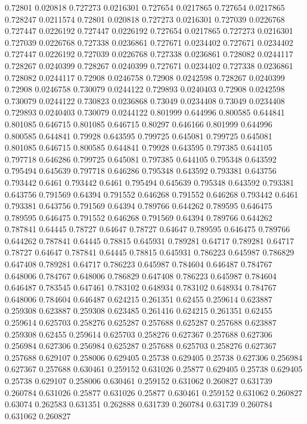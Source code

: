0.72801 0.020818
0.727273 0.0216301
0.727654 0.0217865
0.727654 0.0217865
0.728247 0.0211574
0.72801 0.020818
0.727273 0.0216301
0.727039 0.0226768
0.727447 0.0226192
0.727447 0.0226192
0.727654 0.0217865
0.727273 0.0216301
0.727039 0.0226768
0.727338 0.0236861
0.727671 0.0234402
0.727671 0.0234402
0.727447 0.0226192
0.727039 0.0226768
0.727338 0.0236861
0.728082 0.0244117
0.728267 0.0240399
0.728267 0.0240399
0.727671 0.0234402
0.727338 0.0236861
0.728082 0.0244117
0.72908 0.0246758
0.72908 0.0242598
0.728267 0.0240399
0.72908 0.0246758
0.730079 0.0244122
0.729893 0.0240403
0.72908 0.0242598
0.730079 0.0244122
0.730823 0.0236868
0.73049 0.0234408
0.73049 0.0234408
0.729893 0.0240403
0.730079 0.0244122
0.801999 0.644996
0.800585 0.644841
0.801085 0.646715
0.801085 0.646715
0.80297 0.646166
0.801999 0.644996
0.800585 0.644841
0.79928 0.643595
0.799725 0.645081
0.799725 0.645081
0.801085 0.646715
0.800585 0.644841
0.79928 0.643595
0.797385 0.644105
0.797718 0.646286
0.799725 0.645081
0.797385 0.644105
0.795348 0.643592
0.795494 0.645639
0.797718 0.646286
0.795348 0.643592
0.793381 0.643756
0.793442 0.6461
0.793442 0.6461
0.795494 0.645639
0.795348 0.643592
0.793381 0.643756
0.791569 0.64394
0.791552 0.646268
0.791552 0.646268
0.793442 0.6461
0.793381 0.643756
0.791569 0.64394
0.789766 0.644262
0.789595 0.646475
0.789595 0.646475
0.791552 0.646268
0.791569 0.64394
0.789766 0.644262
0.787841 0.64445
0.78727 0.64647
0.78727 0.64647
0.789595 0.646475
0.789766 0.644262
0.787841 0.64445
0.78815 0.645931
0.789281 0.64717
0.789281 0.64717
0.78727 0.64647
0.787841 0.64445
0.78815 0.645931
0.786223 0.645987
0.786829 0.647408
0.789281 0.64717
0.786223 0.645987
0.784604 0.646487
0.784767 0.648006
0.784767 0.648006
0.786829 0.647408
0.786223 0.645987
0.784604 0.646487
0.783545 0.647461
0.783102 0.648934
0.783102 0.648934
0.784767 0.648006
0.784604 0.646487
0.624215 0.261351
0.62455 0.259614
0.623887 0.259308
0.623887 0.259308
0.623485 0.261416
0.624215 0.261351
0.62455 0.259614
0.625703 0.258276
0.625287 0.257688
0.625287 0.257688
0.623887 0.259308
0.62455 0.259614
0.625703 0.258276
0.627367 0.257688
0.627306 0.256984
0.627306 0.256984
0.625287 0.257688
0.625703 0.258276
0.627367 0.257688
0.629107 0.258006
0.629405 0.25738
0.629405 0.25738
0.627306 0.256984
0.627367 0.257688
0.630461 0.259152
0.631026 0.25877
0.629405 0.25738
0.629405 0.25738
0.629107 0.258006
0.630461 0.259152
0.631062 0.260827
0.631739 0.260784
0.631026 0.25877
0.631026 0.25877
0.630461 0.259152
0.631062 0.260827
0.63074 0.262583
0.631351 0.262888
0.631739 0.260784
0.631739 0.260784
0.631062 0.260827
